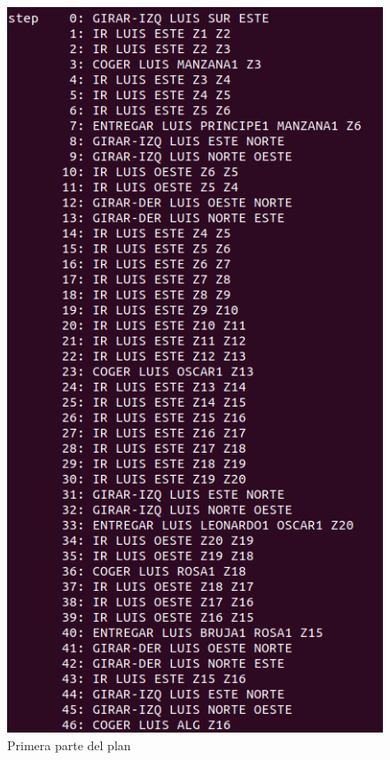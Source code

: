 \begin{figure}[H]
	\begin{minipage}[b]{0.5\linewidth}
		\centering
		\includegraphics[width=\linewidth]{ej4-1.png}
		\caption{Primera parte del plan}
		\label{fig:ej4-1}
	\end{minipage}
	\hspace{0.5cm}

\end{figure}
